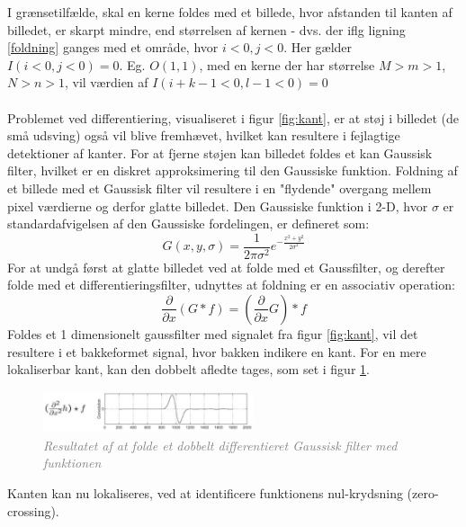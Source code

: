I grænsetilfælde, skal en kerne foldes med et billede, hvor afstanden til kanten af billedet, er skarpt mindre, end størrelsen af kernen - dvs. der iflg ligning \eqref{foldning} ganges med et område, hvor $i < 0, j < 0$. Her gælder $I(i < 0, j < 0) = 0$. Eg. $O(1,1)$, med en kerne der har størrelse $M > m > 1$, $N > n > 1$, vil værdien af $I(i+k-1 < 0, l-1 <0) = 0$  \\
\\
Problemet ved differentiering, visualiseret i figur \ref{fig:kant}, er at støj i billedet (de små udsving) også vil blive fremhævet, hvilket kan resultere i fejlagtige detektioner af kanter. For at fjerne støjen kan billedet foldes et kan Gaussisk filter, hvilket er en diskret approksimering til den Gaussiske funktion. Foldning af et billede med et Gaussisk filter vil resultere i en "flydende" overgang mellem pixel værdierne og derfor glatte billedet. Den Gaussiske funktion i 2-D, hvor $ \sigma $ er standardafvigelsen af den Gaussiske fordelingen, er defineret som:
\begin{equation}
G(x,y,\sigma) = \frac{1}{2 \pi \sigma ^{2}} e^{- \frac{x^{2} + y^{2}}{2 \sigma ^{2}}}
\label{2dgaussian}
\end{equation} 
For at undgå først at glatte billedet ved at folde med et Gaussfilter, og derefter folde med et differentieringsfilter, udnyttes at foldning er en associativ operation:
\begin{equation}
\dfrac{\partial}{\partial x}(G \ast f) = (\dfrac{\partial}{\partial x}G) \ast f
\end{equation}
Foldes et 1 dimensionelt gaussfilter med signalet fra figur \ref{fig:kant}, vil det resultere i et bakkeformet signal, hvor bakken indikere en kant. For en mere lokaliserbar kant, kan den dobbelt afledte tages, som set i figur \ref{fig:deriv}.
\begin{figure}[H]
    \centering
    \includegraphics[width=0.55\textwidth]{fig/8.png}
    \vspace{-1em}   
    \begin{center}
    \caption{\textcolor{gray}{\footnotesize \textit{
     Resultatet af at folde et dobbelt differentieret Gaussisk filter med funktionen}}}
    \label{fig:deriv}
     \end{center}
    \vspace{-2.5em}  
  \end{figure}
\noindent
Kanten kan nu lokaliseres, ved at identificere funktionens nul-krydsning (zero-crossing).